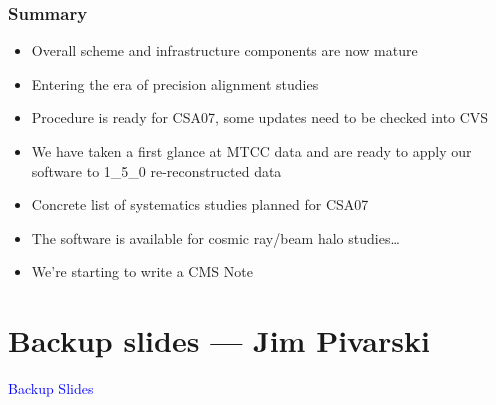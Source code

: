 \documentclass[compress]{beamer}
\begin{document}
\begin{frame}
\frametitle{Summary}
\begin{itemize}\setlength{\itemsep}{0.25 cm}
\item Overall scheme and infrastructure components are now mature
\item Entering the era of precision alignment studies
\item Procedure is ready for CSA07, some updates need to be checked into CVS
\item We have taken a first glance at MTCC data and are ready to apply our software to 1\_5\_0 re-reconstructed data
\item Concrete list of systematics studies planned for CSA07
\item The software is available for cosmic ray/beam halo studies\ldots
\item We're starting to write a CMS Note
\end{itemize}
\label{numpages}
\end{frame}

\section*{Backup slides --- Jim Pivarski}

\begin{frame}
\begin{center}
\huge \textcolor{blue}{Backup Slides}
\end{center}
\end{frame}
\end{document}
